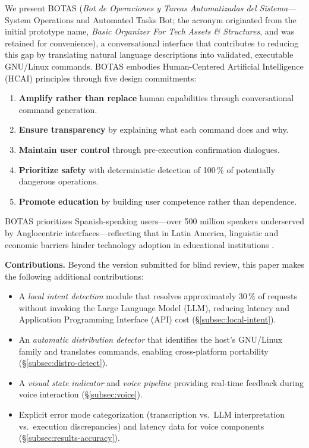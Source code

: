 \documentclass[10pt,a4paper]{article}
\begin{document}
We present BOTAS (\textit{Bot de Operaciones y Tareas Automatizadas del Sistema}---System Operations and Automated Tasks Bot; the acronym originated from the initial prototype name, \textit{Basic Organizer For Tech Assets \& Structures}, and was retained for convenience), a conversational interface that contributes to reducing this gap by translating natural language descriptions into validated, executable GNU/Linux commands. BOTAS embodies Human-Centered Artificial Intelligence (HCAI) principles \citep{Shneiderman2020} through five design commitments:

\begin{enumerate}[noitemsep,topsep=0pt]
    \item \textbf{Amplify rather than replace} human capabilities through conversational command generation.
    \item \textbf{Ensure transparency} by explaining what each command does and why.
    \item \textbf{Maintain user control} through pre-execution confirmation dialogues.
    \item \textbf{Prioritize safety} with deterministic detection of 100\,\% of potentially dangerous operations.
    \item \textbf{Promote education} by building user competence rather than dependence.
\end{enumerate}

BOTAS prioritizes Spanish-speaking users---over 500 million speakers underserved by Anglocentric interfaces---reflecting that in Latin America, linguistic and economic barriers hinder technology adoption in educational institutions \citep{Warschauer2004, CEPAL2023}.

\noindent\textbf{Contributions.} Beyond the version submitted for blind review, this paper makes the following additional contributions:
\begin{itemize}[noitemsep,topsep=0pt]
    \item A \emph{local intent detection} module that resolves approximately 30\,\% of requests without invoking the Large Language Model (LLM), reducing latency and Application Programming Interface (API) cost (\S\ref{subsec:local-intent}).
    \item An \emph{automatic distribution detector} that identifies the host's GNU/Linux family and translates commands, enabling cross-platform portability (\S\ref{subsec:distro-detect}).
    \item A \emph{visual state indicator} and \emph{voice pipeline} providing real-time feedback during voice interaction (\S\ref{subsec:voice}).
    \item Explicit error mode categorization (transcription vs.\ LLM interpretation vs.\ execution discrepancies) and latency data for voice components (\S\ref{subsec:results-accuracy}).
\end{itemize}
\end{document}

